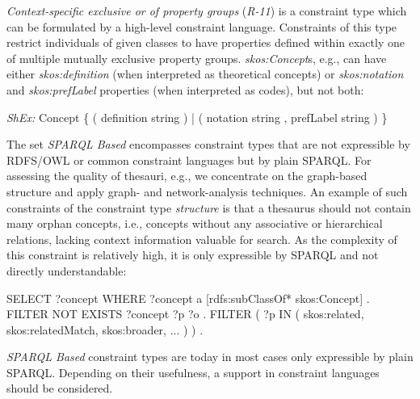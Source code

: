 \documentclass[conference]{IEEEtran}
\begin{document}
\emph{Context-specific exclusive or of property groups} (\emph{R-11}) is a constraint type which can be formulated by a high-level constraint language. Constraints of this type restrict individuals of given classes to have properties defined within exactly one of multiple mutually exclusive property groups. \emph{skos:Concept}s, e.g., can have either \emph{skos:definition} (when interpreted as theoretical concepts) or \emph{skos:notation} and \emph{skos:prefLabel} properties (when interpreted as codes), but not both:

\begin{ex}[commandchars=\\\{\}]
\textit{ShEx:} Concept \{ 
    ( definition string ) |
    ( notation string , prefLabel string ) \}
\end{ex}


The set \emph{SPARQL Based} encompasses constraint types that are not expressible by RDFS/OWL or common constraint languages but by plain SPARQL. For assessing the quality of thesauri, e.g., we concentrate on the graph-based structure and apply graph- and network-analysis techniques.
An example of such constraints of the constraint type \emph{structure} is that 
a thesaurus should not contain many orphan concepts, i.e., concepts without any associative or hierarchical relations, lacking context information valuable for search. As the complexity of this constraint is relatively high, it is only expressible by SPARQL and not directly understandable:
\begin{ex}
SELECT ?concept WHERE {
    ?concept a [rdfs:subClassOf* skos:Concept] .
    FILTER NOT EXISTS { ?concept ?p ?o . 
        FILTER ( ?p IN ( skos:related, skos:relatedMatch, 
                         skos:broader, ... ) ) . } }
\end{ex}
\emph{SPARQL Based} constraint types are today in most cases only expressible by plain SPARQL. Depending on their usefulness, a support in constraint languages should be considered.
\end{document}
